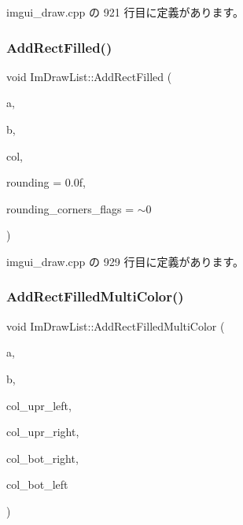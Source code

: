  imgui\+\_\+draw.\+cpp の 921 行目に定義があります。

\mbox{\label{struct_im_draw_list_a1fa7c9165958909bba53c9740a607872}} 
\subsubsection{\texorpdfstring{Add\+Rect\+Filled()}{AddRectFilled()}}
{\footnotesize\ttfamily void Im\+Draw\+List\+::\+Add\+Rect\+Filled (\begin{DoxyParamCaption}\item[{const \mbox{\hyperlink{struct_im_vec2}{Im\+Vec2}} \&}]{a,  }\item[{const \mbox{\hyperlink{struct_im_vec2}{Im\+Vec2}} \&}]{b,  }\item[{\mbox{\hyperlink{imgui_8h_a118cff4eeb8d00e7d07ce3d6460eed36}{Im\+U32}}}]{col,  }\item[{float}]{rounding = {\ttfamily 0.0f},  }\item[{int}]{rounding\+\_\+corners\+\_\+flags = {\ttfamily $\sim$0} }\end{DoxyParamCaption})}



 imgui\+\_\+draw.\+cpp の 929 行目に定義があります。

\mbox{\label{struct_im_draw_list_ab658e574f3ef67a8d6cc0a86f13f5176}} 
\subsubsection{\texorpdfstring{Add\+Rect\+Filled\+Multi\+Color()}{AddRectFilledMultiColor()}}
{\footnotesize\ttfamily void Im\+Draw\+List\+::\+Add\+Rect\+Filled\+Multi\+Color (\begin{DoxyParamCaption}\item[{const \mbox{\hyperlink{struct_im_vec2}{Im\+Vec2}} \&}]{a,  }\item[{const \mbox{\hyperlink{struct_im_vec2}{Im\+Vec2}} \&}]{b,  }\item[{\mbox{\hyperlink{imgui_8h_a118cff4eeb8d00e7d07ce3d6460eed36}{Im\+U32}}}]{col\+\_\+upr\+\_\+left,  }\item[{\mbox{\hyperlink{imgui_8h_a118cff4eeb8d00e7d07ce3d6460eed36}{Im\+U32}}}]{col\+\_\+upr\+\_\+right,  }\item[{\mbox{\hyperlink{imgui_8h_a118cff4eeb8d00e7d07ce3d6460eed36}{Im\+U32}}}]{col\+\_\+bot\+\_\+right,  }\item[{\mbox{\hyperlink{imgui_8h_a118cff4eeb8d00e7d07ce3d6460eed36}{Im\+U32}}}]{col\+\_\+bot\+\_\+left }\end{DoxyParamCaption})}



